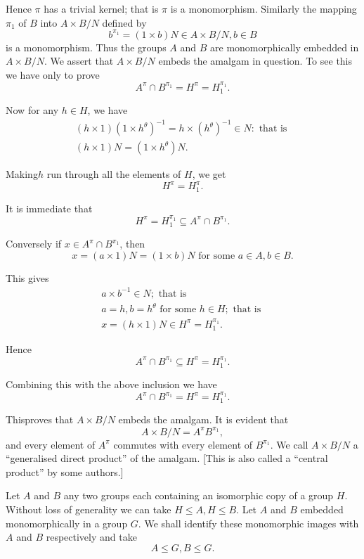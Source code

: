 Hence $\pi$ has a trivial kernel; that is $\pi$ is a
monomorphism. Similarly the mapping $\pi_1$ of $B$ into $A \times B
/N$ defined by  
$$
b^{\pi_1} = (1\times b)N \in  A \times B /N, b \in  B
$$
is a monomorphism. Thus the groups $A$ and $B$ are monomorphically
embedded in $A \times B/N$. We assert that $A \times B /N$ embeds the
amalgam in question. To see this we have only to prove  
$$
A^{\pi}\cap B^{\pi_1} = H^{\pi} = H_1^{\pi_1}.
$$

Now for any $h \in  H$, we have 
\begin{gather*}
  (h \times 1)( 1 \times h^\theta )^{-1} = h \times ( h^\theta )^{-1}
  \in  N : \text{ that is }\\ 
  (h \times 1) N = (1 \times h^\theta ) N. 
\end{gather*}

Making\pageoriginale $h$ run through all the elements of $H$, we get 
$$
H^{\pi}= H_1^{\pi}. 
$$

It is immediate that 
$$
H^\pi = H_1^{\pi_1} \subseteq A^\pi \cap B ^{\pi_1}.
$$

Conversely if $x \in  A^\pi \cap B^{\pi _1}$, then 
$$
x = (a \times 1) N = (1 \times b) N  \text{ for some  } a  \in 
A, b \in  B.   
$$

This gives 
\begin{gather*}
  a \times b^{-1} \in  N ; \text{ that is } \\
  a = h, b = h^\theta \text{ for some } h \in  H ; \text{ that is }  \\
  x = (h \times 1)N \in  H^{\pi} =  H_1 ^{\pi_1}.
\end{gather*}

Hence 
$$
A^\pi   \cap B^{\pi _1} \subseteq H^{\pi } = H^{\pi _1}_1. 
$$

Combining this with the above inclusion we have 
$$
A^\pi  \cap B^{\pi _1} = H^\pi  = H^{\pi _1}_1. 
$$

This\pageoriginale proves that $A \times B /N$ embeds the amalgam. It is evident that 
$$
A \times B /N = A^{\pi } B^{\pi _1}, 
$$
and every element of $A^{\pi }$ commutes with every element of $B^{
  \pi_1}$. We call $A \times B/N$ a ``generalised direct product'' of
the amalgam. [This is also called a ``central product'' by some
  authors.] 

Let $A$ and $B$ any two groups each containing an isomorphic copy of a
group $H$. Without loss of generality we can take $H \leq A, H \leq
B$. Let $A$ and $B$ embedded monomorphically in a group $G$. We shall
identify these monomorphic images with $A$ and $B$ respectively and
take  
$$
A \leq G, B \leq G. 
$$

